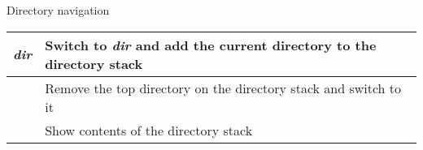 \begin{block}{Directory navigation}
  \begin{tabu} to 0.9\linewidth { X X[4] }
     \textit{dir} & Switch to \textit{dir} and add the current directory to the directory stack \\ \hline
     & Remove the top directory on the directory stack and switch to it \\ \hline
     & Show contents of the directory stack
  \end{tabu}
\end{block}
